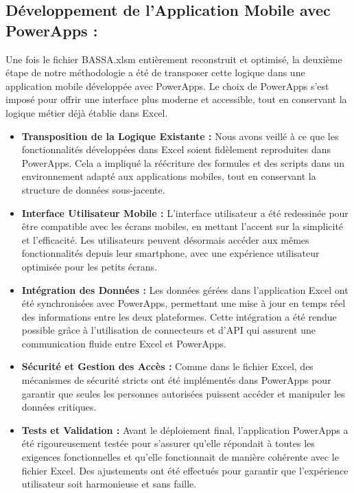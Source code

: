 \documentclass[a4paper, oneside, 12pt, final]{extreport}
\begin{document}
\subsection{Développement de l'Application Mobile avec PowerApps :}
Une fois le fichier BASSA.xlsm entièrement reconstruit et optimisé, la deuxième étape de notre méthodologie a été de transposer cette logique dans une application mobile développée avec PowerApps. Le choix de PowerApps s'est imposé pour offrir une interface plus moderne et accessible, tout en conservant la logique métier déjà établie dans Excel.
\begin{itemize}


\item \textbf{Transposition de la Logique Existante :} Nous avons veillé à ce que les fonctionnalités développées dans Excel soient fidèlement reproduites dans PowerApps. Cela a impliqué la réécriture des formules et des scripts dans un environnement adapté aux applications mobiles, tout en conservant la structure de données sous-jacente.

\item \textbf{Interface Utilisateur Mobile :} L'interface utilisateur a été redessinée pour être compatible avec les écrans mobiles, en mettant l'accent sur la simplicité et l'efficacité. Les utilisateurs peuvent désormais accéder aux mêmes fonctionnalités depuis leur smartphone, avec une expérience utilisateur optimisée pour les petits écrans.

\item \textbf{Intégration des Données :} Les données gérées dans l'application Excel ont été synchronisées avec PowerApps, permettant une mise à jour en temps réel des informations entre les deux plateformes. Cette intégration a été rendue possible grâce à l'utilisation de connecteurs et d'API qui assurent une communication fluide entre Excel et PowerApps.

\item \textbf{Sécurité et Gestion des Accès :} Comme dans le fichier Excel, des mécanismes de sécurité stricts ont été implémentés dans PowerApps pour garantir que seules les personnes autorisées puissent accéder et manipuler les données critiques.

\item \textbf{Tests et Validation :} Avant le déploiement final, l'application PowerApps a été rigoureusement testée pour s'assurer qu'elle répondait à toutes les exigences fonctionnelles et qu'elle fonctionnait de manière cohérente avec le fichier Excel. Des ajustements ont été effectués pour garantir que l'expérience utilisateur soit harmonieuse et sans faille.
\end{itemize}
\end{document}
